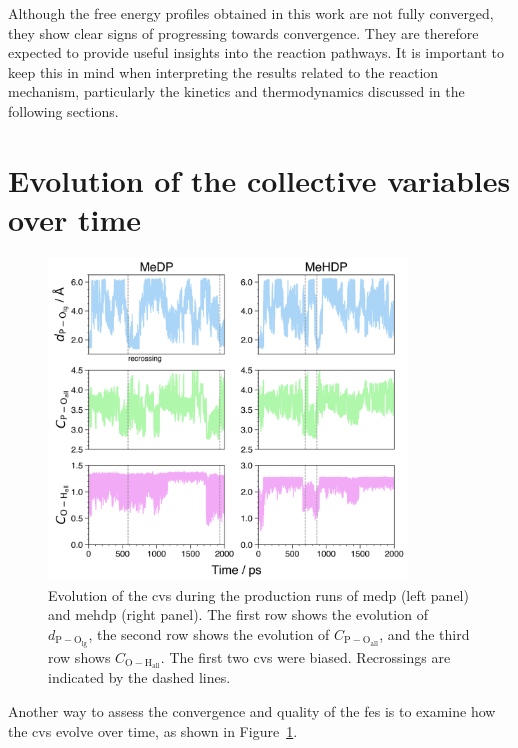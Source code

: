 Although the free energy profiles obtained in this work are not fully converged, they show clear signs of progressing towards convergence. They are therefore expected to provide useful insights into the reaction pathways. It is important to keep this in mind when interpreting the results related to the reaction mechanism, particularly the kinetics and thermodynamics discussed in the following sections.



\section{Evolution of the collective variables over time}

\begin{figure}[t!]
    \centering
    \includegraphics[width=0.85\textwidth]{Figures/4_Results/results_300K_cv_evolution.png}
    \caption{Evolution of the \acp{cv} during the production runs of \ac{medp} (left panel) and \ac{mehdp} (right panel). The first row shows the evolution of $d_\mathrm{P-O_{\mathrm{lg}}}$, the second row shows the evolution of $C_\mathrm{P-O_{\mathrm{all}}}$, and the third row shows $C_\mathrm{O-H_{\mathrm{all}}}$. The first two \acp{cv} were biased. Recrossings are indicated by the dashed lines.}
    \label{fig:300k_cv_evolution}
\end{figure}

Another way to assess the convergence and quality of the \ac{fes} is to examine how the \acp{cv} evolve over time, as shown in Figure~\ref{fig:300k_cv_evolution}.

